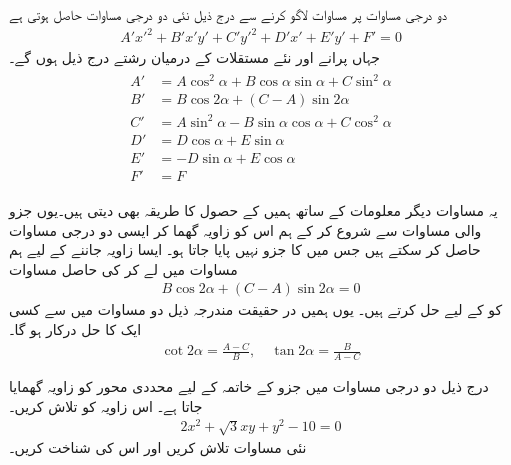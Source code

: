دو درجی مساوات  پر مساوات  لاگو کرنے سے درج ذیل نئی دو درجی مساوات حاصل ہوتی ہے
\begin{align}\label{مساوات_مخروط_گھمانے_کے_بعد}
A'x'^2+B'x'y'+C'y'^2+D'x'+E'y'+F'=0
\end{align}
جہاں پرانے اور نئے مستقلات کے درمیان  رشتے درج ذیل ہوں گے۔
\begin{gather}
\begin{aligned}\label{مساوات_مخروط_گھما_کر_مستقل_کے_تعلق}
A'&=A\cos^2\alpha+B\cos\alpha\sin\alpha+C\sin^2\alpha\\
B'&=B\cos2\alpha+(C-A)\sin2\alpha\\
C'&=A\sin^2\alpha-B\sin\alpha\cos\alpha+C\cos^2\alpha\\
D'&=D\cos\alpha+E\sin\alpha\\
E'&=-D\sin\alpha+E\cos\alpha\\
F'&=F
\end{aligned}
\end{gather}

یہ مساوات دیگر معلومات کے ساتھ ہمیں  کے حصول کا طریقہ بھی دیتی ہیں۔یوں  جزو والی مساوات سے شروع کر کے ہم اس کو  زاویہ  گھما کر ایسی دو درجی مساوات حاصل کر سکتے ہیں جس میں  کا جزو نہیں پایا جاتا ہو۔ ایسا زاویہ جاننے کے لیے ہم مساوات  میں  لے کر  کی  حاصل مساوات
\begin{align*}
B\cos2\alpha+(C-A)\sin2\alpha=0
\end{align*}
کو   کے لیے حل کرتے ہیں۔ یوں ہمیں در حقیقت مندرجہ ذیل دو مساوات میں سے کسی ایک کا حل درکار ہو گا۔
\begin{align}\label{مساوات_مخروط_زاویہ_جو_سادہ_مساوات_دیگا}
\cot 2\alpha=\frac{A-C}{B},\quad \tan2\alpha=\frac{B}{A-C}
\end{align} 

درج ذیل دو درجی مساوات میں    جزو کے خاتمہ کے لیے محددی محور کو زاویہ  گھمایا جاتا ہے۔ اس زاویہ کو تلاش کریں۔
\begin{align*}
2x^2+\sqrt{3}xy+y^2-10=0
\end{align*}
نئی مساوات تلاش کریں اور اس کی شناخت کریں۔

